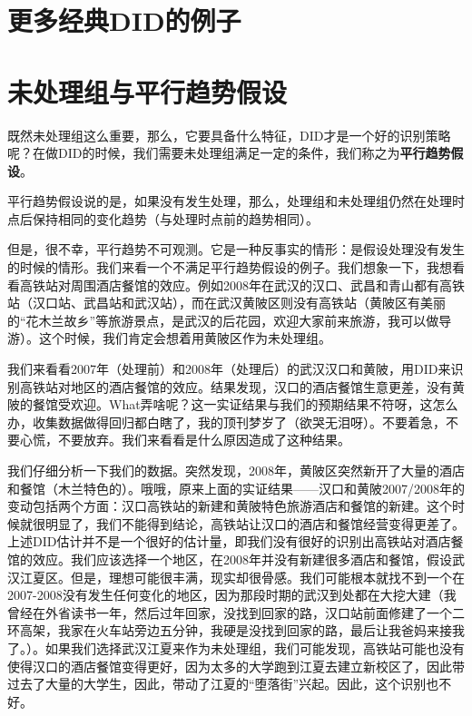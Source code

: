 \documentclass[cn,12pt,math=newtx,citestyle=gb7714-2015,bibstyle=gb7714-2015]{elegantbook}
\begin{document}
	
	\section{更多经典DID的例子}
	
	
	
	\section{未处理组与平行趋势假设}
	
	既然未处理组这么重要，那么，它要具备什么特征，DID才是一个好的识别策略呢？在做DID的时候，我们需要未处理组满足一定的条件，我们称之为\textbf{平行趋势假设}。
	
	平行趋势假设说的是，如果没有发生处理，那么，处理组和未处理组仍然在处理时点后保持相同的变化趋势（与处理时点前的趋势相同）。
	
	但是，很不幸，平行趋势不可观测。它是一种反事实的情形：是假设处理没有发生的时候的情形。我们来看一个不满足平行趋势假设的例子。我们想象一下，我想看看高铁站对周围酒店餐馆的效应。例如2008年在武汉的汉口、武昌和青山都有高铁站（汉口站、武昌站和武汉站），而在武汉黄陂区则没有高铁站（黄陂区有美丽的“花木兰故乡”等旅游景点，是武汉的后花园，欢迎大家前来旅游，我可以做导游）。这个时候，我们肯定会想着用黄陂区作为未处理组。
	
	我们来看看2007年（处理前）和2008年（处理后）的武汉汉口和黄陂，用DID来识别高铁站对地区的酒店餐馆的效应。结果发现，汉口的酒店餐馆生意更差，没有黄陂的餐馆受欢迎。What弄啥呢？这一实证结果与我们的预期结果不符呀，这怎么办，收集数据做得回归都白瞎了，我的顶刊梦岁了（欲哭无泪呀）。不要着急，不要心慌，不要放弃。我们来看看是什么原因造成了这种结果。
	
	我们仔细分析一下我们的数据。突然发现，2008年，黄陂区突然新开了大量的酒店和餐馆（木兰特色的）。哦哦，原来上面的实证结果——汉口和黄陂2007/2008年的变动包括两个方面：汉口高铁站的新建和黄陂特色旅游酒店和餐馆的新建。这个时候就很明显了，我们不能得到结论，高铁站让汉口的酒店和餐馆经营变得更差了。上述DID估计并不是一个很好的估计量，即我们没有很好的识别出高铁站对酒店餐馆的效应。我们应该选择一个地区，在2008年并没有新建很多酒店和餐馆，假设武汉江夏区。但是，理想可能很丰满，现实却很骨感。我们可能根本就找不到一个在2007-2008没有发生任何变化的地区，因为那段时期的武汉到处都在大挖大建（我曾经在外省读书一年，然后过年回家，没找到回家的路，汉口站前面修建了一个二环高架，我家在火车站旁边五分钟，我硬是没找到回家的路，最后让我爸妈来接我了。）。如果我们选择武汉江夏来作为未处理组，我们可能发现，高铁站可能也没有使得汉口的酒店餐馆变得更好，因为太多的大学跑到江夏去建立新校区了，因此带过去了大量的大学生，因此，带动了江夏的“堕落街”兴起。因此，这个识别也不好。
	
\end{document}
